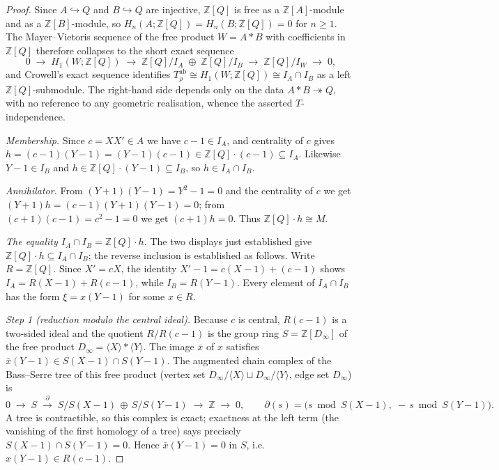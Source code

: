 \documentclass[11pt]{article}
\theoremstyle{plain}
\theoremstyle{definition}
\theoremstyle{remark}
\begin{document}
\begin{proof}
Since $A \hookrightarrow Q$ and $B \hookrightarrow Q$ are injective,
$\mathbb{Z}[Q]$ is free as a $\mathbb{Z}[A]$-module and as a
$\mathbb{Z}[B]$-module, so $H_n(A; \mathbb{Z}[Q]) = H_n(B; \mathbb{Z}[Q])
= 0$ for $n \ge 1$.  The Mayer--Vietoris sequence of the free product
$W = A * B$ with coefficients in $\mathbb{Z}[Q]$ therefore collapses to
the short exact sequence
\[
0 \;\to\; H_1(W; \mathbb{Z}[Q])
   \;\to\; \mathbb{Z}[Q]/I_A \;\oplus\; \mathbb{Z}[Q]/I_B
   \;\to\; \mathbb{Z}[Q]/I_W \;\to\; 0,
\]
and Crowell's exact sequence \cite{Crowell} identifies
$T_\rho^{\mathrm{ab}} \cong H_1(W; \mathbb{Z}[Q]) \cong I_A \cap I_B$ as
a left $\mathbb{Z}[Q]$-submodule.  The right-hand side depends only on
the data $A * B \twoheadrightarrow Q$, with no reference to any
geometric realisation, whence the asserted $T$-independence.

\emph{Membership.}  Since $c = XX' \in A$ we have $c - 1 \in I_A$, and
centrality of $c$ gives
$h = (c-1)(Y-1) = (Y-1)(c-1) \in \mathbb{Z}[Q]\cdot(c-1) \subseteq I_A$.
Likewise $Y - 1 \in I_B$ and
$h \in \mathbb{Z}[Q]\cdot(Y-1) \subseteq I_B$, so
$h \in I_A \cap I_B$.

\emph{Annihilator.}  From $(Y+1)(Y-1) = Y^2 - 1 = 0$ and the centrality
of $c$ we get $(Y+1)h = (c-1)(Y+1)(Y-1) = 0$; from $(c+1)(c-1) = c^2 - 1
= 0$ we get $(c+1)h = 0$.  Thus $\mathbb{Z}[Q]\cdot h \cong M$.

\emph{The equality $I_A \cap I_B = \mathbb{Z}[Q]\cdot h$.}
The two displays just established give
$\mathbb{Z}[Q]\cdot h \subseteq I_A \cap I_B$; the reverse inclusion is
established as follows.  Write $R = \mathbb{Z}[Q]$.  Since $X' = cX$, the
identity $X' - 1 = c(X-1) + (c-1)$ shows $I_A = R(X-1) + R(c-1)$, while
$I_B = R(Y-1)$.  Every element of $I_A \cap I_B$ has the form
$\xi = x(Y-1)$ for some $x \in R$.

\emph{Step 1 (reduction modulo the central ideal).}  Because $c$ is
central, $R(c-1)$ is a two-sided ideal and the quotient
$R / R(c-1)$ is the group ring $S = \mathbb{Z}[D_\infty]$ of the free
product $D_\infty = \langle X \rangle * \langle Y \rangle$.  The image
$\bar x$ of $x$ satisfies $\bar x(Y-1) \in S(X-1) \cap S(Y-1)$.  The
augmented chain complex of the Bass--Serre tree of this free product (vertex set $D_\infty/\langle X\rangle \sqcup D_\infty/\langle Y\rangle$,
edge set $D_\infty$) is
\[
0 \;\to\; S \;\xrightarrow{\;\partial\;}\;
S/S(X-1) \,\oplus\, S/S(Y-1) \;\to\; \mathbb{Z} \;\to\; 0,
\qquad
\partial(s) = \bigl(s \bmod S(X-1),\; -\,s \bmod S(Y-1)\bigr).
\]
A tree is contractible, so this complex is exact; exactness at the left
term (the vanishing of the first homology of a tree) says
precisely $S(X-1) \cap S(Y-1) = 0$.  Hence $\bar x(Y-1) = 0$ in $S$,
i.e.\ $x(Y-1) \in R(c-1)$.


\end{proof}
\end{document}

